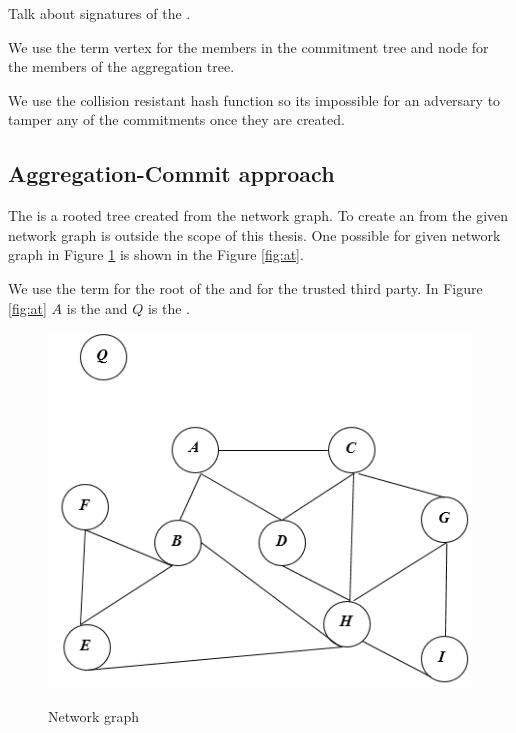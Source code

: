 	Talk about signatures of the \payloads.

	We use the term vertex for the members in the commitment tree and node for the members of the aggregation tree.
	
	We use the collision resistant hash function so its impossible for an adversary to tamper any of the commitments once they are created.

	\subsection{Aggregation-Commit approach}
		The \at is a rooted tree created from the network graph. To create an \at from the given network graph is outside the scope of this thesis. One possible \at for given network graph in Figure \ref{fig:ng} is shown in the Figure \ref{fig:at}.

		We use the term \bs for the root of the \at and \q for the trusted third party. In Figure \ref{fig:at} $A$ is the \bs and $Q$ is the \q.
		
		\begin{figure}[hp]
			\centering
			\includegraphics[scale = 0.6]{images/network-graph.png}\\
			\caption{Network graph}
			\label{fig:ng}
		\end{figure}

